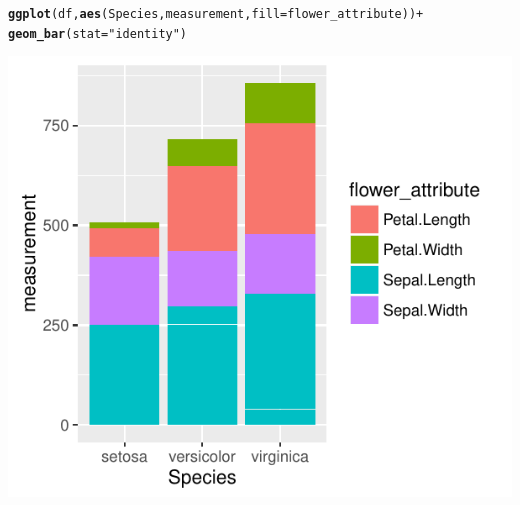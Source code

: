 \documentclass{beamer}\usepackage[]{graphicx}\usepackage[]{color}
\makeatletter
\newcommand{\hlstr}[1]{\textcolor[rgb]{0.192,0.494,0.8}{#1}}%
\newcommand{\hlopt}[1]{\textcolor[rgb]{0,0,0}{#1}}%
\newcommand{\hlstd}[1]{\textcolor[rgb]{0.345,0.345,0.345}{#1}}%
\newcommand{\hlkwc}[1]{\textcolor[rgb]{0.333,0.667,0.333}{#1}}%
\newcommand{\hlkwd}[1]{\textcolor[rgb]{0.737,0.353,0.396}{\textbf{#1}}}%
\newenvironment{kframe}{%
 \def\at@end@of@kframe{}%
 \ifinner\ifhmode%
  \def\at@end@of@kframe{\end{minipage}}%
  \begin{minipage}{\columnwidth}%
 \fi\fi%
 \def\FrameCommand##1{\hskip\@totalleftmargin \hskip-\fboxsep
 \colorbox{shadecolor}{##1}\hskip-\fboxsep
     \hskip-\linewidth \hskip-\@totalleftmargin \hskip\columnwidth}%
 \MakeFramed {\advance\hsize-\width
   \@totalleftmargin\z@ \linewidth\hsize
   \@setminipage}}%
 {\par\unskip\endMakeFramed%
 \at@end@of@kframe}
\newenvironment{knitrout}{}{} %
\makeatother
\begin{document}
\begin{frame}[fragile]
\begin{knitrout}\footnotesize
{}\color{fgcolor}\begin{kframe}
\begin{alltt}
\hlkwd{ggplot}\hlstd{(df,} \hlkwd{aes}\hlstd{(Species, measurement,} \hlkwc{fill} \hlstd{= flower_attribute))} \hlopt{+}
    \hlkwd{geom_bar}\hlstd{(}\hlkwc{stat} \hlstd{=} \hlstr{"identity"}\hlstd{)}
\end{alltt}
\end{kframe}

{\centering \includegraphics[width=.75\linewidth]{figure/bartwo-1} 

}



\end{knitrout}
\end{frame}

\end{document}
